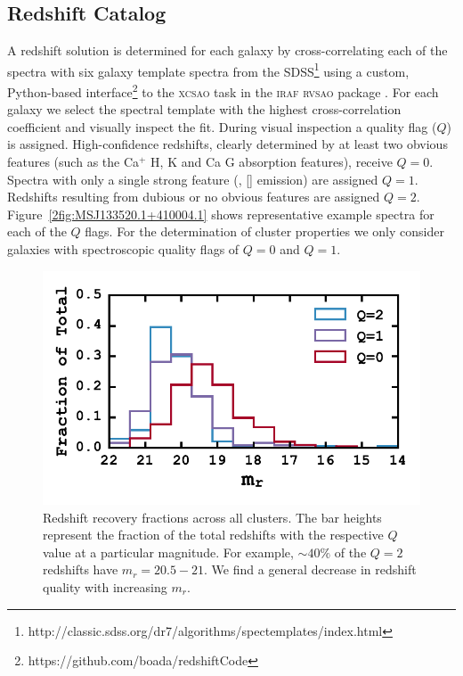 \subsection{Redshift Catalog}\label{2sec:redshift catalog} 
A redshift solution is determined for each galaxy by cross-correlating \citep{Tonry1979} each of the spectra with six galaxy template spectra from the SDSS\footnote{http://classic.sdss.org/dr7/algorithms/spectemplates/index.html} using a custom, Python-based interface\footnote{https://github.com/boada/redshiftCode} to the \textsc{xcsao} task in the \textsc{iraf} \textsc{rvsao} package \citep{Kurtz1992, Kurtz1998}. For each galaxy we select the spectral template with the highest cross-correlation coefficient and visually inspect the fit. During visual inspection a quality flag ($Q$) is assigned. High-confidence redshifts, clearly determined by at least two obvious features (such as the Ca$^+$ H, K and Ca G absorption features), receive $Q=0$. Spectra with only a single strong feature (\eg, \hbox{[]} emission) are assigned $Q=1$. Redshifts resulting from dubious or no obvious features are assigned $Q=2$. Figure~\ref{2fig:MSJ133520.1+410004.1} shows representative example spectra for each of the $Q$ flags. For the determination of cluster properties we only consider galaxies with spectroscopic quality flags of $Q=0$ and $Q=1$. 

\begin{figure}[t]
	\begin{center}
		\includegraphics[width=\textwidth]{figures2/redshiftHist.pdf}
	\end{center}
	\caption[Redshift recovery fractions across all clusters]{Redshift recovery fractions across all clusters. The bar heights represent the fraction of the total redshifts with the respective $Q$ value at a particular magnitude. For example, $\sim 40\%$ of the $Q=2$ redshifts have $m_r = 20.5-21$. We find a general decrease in redshift quality with increasing $m_r$. } 
	\label{2fig:redshiftHist} 
\end{figure}

